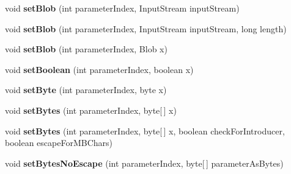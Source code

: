 \begin{DoxyCompactItemize}
void {\bfseries set\+Blob} (int parameter\+Index, Input\+Stream input\+Stream)
\item 
\mbox{\label{classcom_1_1mysql_1_1cj_1_1_server_prepared_query_bindings_a24fc6f66b7713d7e0b97be6d5ea7df53}} 
void {\bfseries set\+Blob} (int parameter\+Index, Input\+Stream input\+Stream, long length)
\item 
\mbox{\label{classcom_1_1mysql_1_1cj_1_1_server_prepared_query_bindings_af6a3ba466e49614d3fc89f149064c8a8}} 
void {\bfseries set\+Blob} (int parameter\+Index, Blob x)
\item 
\mbox{\label{classcom_1_1mysql_1_1cj_1_1_server_prepared_query_bindings_a7650f0c71b10f4031e0618c67caa49c4}} 
void {\bfseries set\+Boolean} (int parameter\+Index, boolean x)
\item 
\mbox{\label{classcom_1_1mysql_1_1cj_1_1_server_prepared_query_bindings_aa5eb382beb3a3f46e3b10c241d0e08b9}} 
void {\bfseries set\+Byte} (int parameter\+Index, byte x)
\item 
\mbox{\label{classcom_1_1mysql_1_1cj_1_1_server_prepared_query_bindings_a2a41a80f8d33e94789246c672600b59b}} 
void {\bfseries set\+Bytes} (int parameter\+Index, byte\mbox{[}$\,$\mbox{]} x)
\item 
\mbox{\label{classcom_1_1mysql_1_1cj_1_1_server_prepared_query_bindings_a437398de7d3ea2b63585fd8f70757977}} 
void {\bfseries set\+Bytes} (int parameter\+Index, byte\mbox{[}$\,$\mbox{]} x, boolean check\+For\+Introducer, boolean escape\+For\+M\+B\+Chars)
\item 
\mbox{\label{classcom_1_1mysql_1_1cj_1_1_server_prepared_query_bindings_ae5db575417b547ac58cf4576fc48d547}} 
void {\bfseries set\+Bytes\+No\+Escape} (int parameter\+Index, byte\mbox{[}$\,$\mbox{]} parameter\+As\+Bytes)
\item 
\mbox{\label{classcom_1_1mysql_1_1cj_1_1_server_prepared_query_bindings_a1de1bfdb273582492d793feb80bdb893}} 

\end{DoxyCompactItemize}

